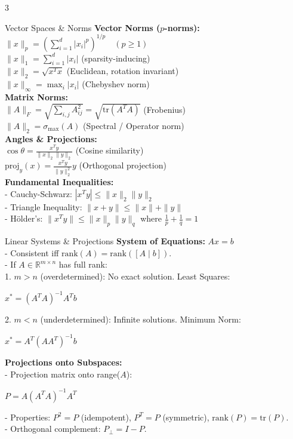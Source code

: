 \documentclass[10pt]{article}
\begin{document}
\begin{multicols*}{3}

\begin{laBox}{Vector Spaces \& Norms}
\textbf{Vector Norms ($p$-norms):} \\
$\|x\|_p = \left( \sum_{i=1}^d |x_i|^p \right)^{1/p} \quad (p \ge 1)$ \\
$\|x\|_1 = \sum_{i=1}^d |x_i|$ \quad (sparsity-inducing) \\
$\|x\|_2 = \sqrt{x^T x}$ \quad (Euclidean, rotation invariant) \\
$\|x\|_\infty = \max_{i} |x_i|$ \quad (Chebyshev norm) \\
\textbf{Matrix Norms:} \\
$\|A\|_F = \sqrt{\sum_{i,j} A_{ij}^2} = \sqrt{\text{tr}(A^T A)}$ \quad (Frobenius) \\
$\|A\|_2 = \sigma_{\max}(A)$ \quad (Spectral / Operator norm) \\
\textbf{Angles \& Projections:} \\
$\cos\theta = \frac{x^T y}{\|x\|_2 \|y\|_2}$ \quad (Cosine similarity) \\
$\text{proj}_y(x) = \frac{x^T y}{\|y\|_2^2} y$ \quad (Orthogonal projection) \\
\textbf{Fundamental Inequalities:} \\
- Cauchy-Schwarz: $|x^T y| \le \|x\|_2 \|y\|_2$ \\
- Triangle Inequality: $\|x + y\| \le \|x\| + \|y\|$ \\
- Hölder's: $\|x^T y\| \le \|x\|_p \|y\|_q$ where $\frac{1}{p} + \frac{1}{q} = 1$
\end{laBox}

\begin{laBox}{Linear Systems \& Projections}
\textbf{System of Equations:} $Ax = b$ \\
- Consistent iff $\text{rank}(A) = \text{rank}([A \mid b])$. \\
- If $A \in \mathbb{R}^{m \times n}$ has full rank: \\
  1. $m > n$ (overdetermined): No exact solution. Least Squares: \\
     {\centering $x^* = (A^T A)^{-1} A^T b$\par}
  2. $m < n$ (underdetermined): Infinite solutions. Minimum Norm: \\
     {\centering $x^* = A^T(A A^T)^{-1} b$\par}
\textbf{Projections onto Subspaces:} \\
- Projection matrix onto range($A$): \\
  {\centering $P = A(A^T A)^{-1} A^T$\par}
- Properties: $P^2 = P$ (idempotent), $P^T = P$ (symmetric), $\text{rank}(P) = \text{tr}(P)$. \\
- Orthogonal complement: $P_\perp = I - P$.
\end{laBox}


\end{multicols*}
\end{document}
